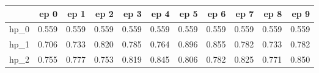 \begin{tabular}{lrrrrrrrrrr}
\toprule
{} &   ep 0 &   ep 1 &   ep 2 &   ep 3 &   ep 4 &   ep 5 &   ep 6 &   ep 7 &   ep 8 &   ep 9 \\
\midrule
hp\_0 &  0.559 &  0.559 &  0.559 &  0.559 &  0.559 &  0.559 &  0.559 &  0.559 &  0.559 &  0.559 \\
hp\_1 &  0.706 &  0.733 &  0.820 &  0.785 &  0.764 &  0.896 &  0.855 &  0.782 &  0.733 &  0.782 \\
hp\_2 &  0.755 &  0.777 &  0.753 &  0.819 &  0.845 &  0.806 &  0.782 &  0.825 &  0.771 &  0.850 \\
\bottomrule
\end{tabular}
